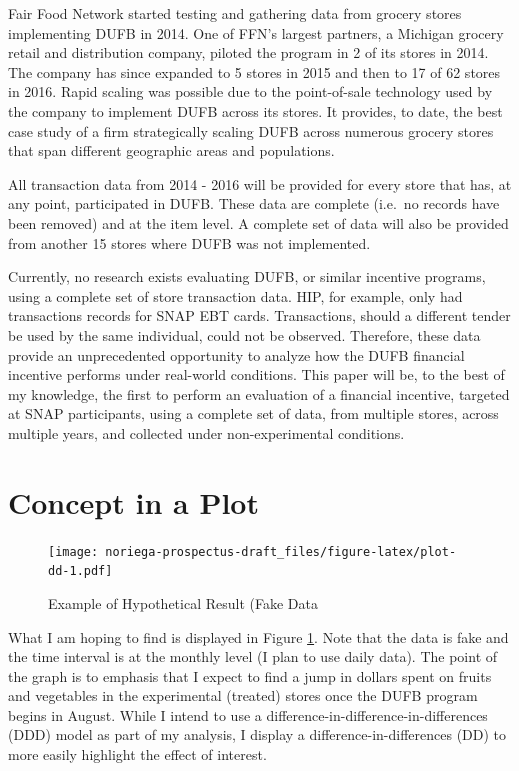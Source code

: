 \documentclass[12pt,letterpaperpaper,]{book}
\begin{document}
Fair Food Network started testing and gathering data from grocery stores
implementing DUFB in 2014. One of FFN's largest partners, a Michigan
grocery retail and distribution company, piloted the program in 2 of its
stores in 2014. The company has since expanded to 5 stores in 2015 and
then to 17 of 62 stores in 2016. Rapid scaling was possible due to the
point-of-sale technology used by the company to implement DUFB across
its stores. It provides, to date, the best case study of a firm
strategically scaling DUFB across numerous grocery stores that span
different geographic areas and populations.

All transaction data from 2014 - 2016 will be provided for every store
that has, at any point, participated in DUFB. These data are complete
(i.e.~no records have been removed) and at the item level. A complete
set of data will also be provided from another 15 stores where DUFB was
not implemented.

Currently, no research exists evaluating DUFB, or similar incentive
programs, using a complete set of store transaction data. HIP, for
example, only had transactions records for SNAP EBT cards. Transactions,
should a different tender be used by the same individual, could not be
observed. Therefore, these data provide an unprecedented opportunity to
analyze how the DUFB financial incentive performs under real-world
conditions. This paper will be, to the best of my knowledge, the first
to perform an evaluation of a financial incentive, targeted at SNAP
participants, using a complete set of data, from multiple stores, across
multiple years, and collected under non-experimental conditions.

\newpage

\section*{Concept in a Plot}\label{concept-in-a-plot}

\begin{figure}
\centering
\texttt{[image: noriega-prospectus-draft\_files/figure-latex/plot-dd-1.pdf]}
\caption{\label{fig:plot-dd}Example of Hypothetical Result (Fake Data}
\end{figure}

What I am hoping to find is displayed in Figure \ref{fig:plot-dd}. Note
that the data is fake and the time interval is at the monthly level (I
plan to use daily data). The point of the graph is to emphasis that I
expect to find a jump in dollars spent on fruits and vegetables in the
experimental (treated) stores once the DUFB program begins in August.
While I intend to use a difference-in-difference-in-differences (DDD)
model as part of my analysis, I display a difference-in-differences (DD)
to more easily highlight the effect of interest.
\end{document}
